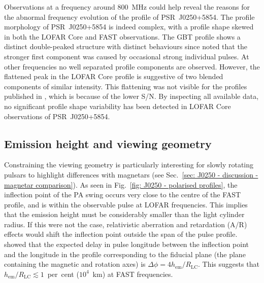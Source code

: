 Observations at a frequency around 800~MHz could help reveal the reasons for the abnormal frequency evolution of the profile of PSR~J0250+5854. The profile morphology of PSR~J0250+5854 is indeed complex, with a profile shape skewed in both the LOFAR Core and FAST observations. The GBT profile shows a distinct double-peaked structure with distinct behaviours since \citet{TBC+2018} noted that the stronger first component was caused by occasional strong individual pulses. At other frequencies no well separated profile components are observed. However, the flattened peak in the LOFAR Core profile is suggestive of two blended components of similar intensity. This flattening was not visible for the profiles published in \citet{TBC+2018}, which is because of the lower S/N. By inspecting all available data, no significant profile shape variability has been detected in LOFAR Core observations of PSR~J0250+5854.
















\subsection{Emission height and viewing geometry}
\label{sec: J0250 - discussion - geometry}
Constraining the viewing geometry is particularly interesting for slowly rotating pulsars to highlight differences with magnetars (see Sec.~\ref{sec: J0250 - discussion - magnetar comparison}). As seen in Fig.~\ref{fig: J0250 - polarised profiles}, the inflection point of the PA swing occurs very close to the centre of the FAST profile, and is within the observable pulse at LOFAR frequencies. This implies that the emission height must be considerably smaller than the light cylinder radius. If this were not the case, relativistic aberration and retardation (A/R) effects would shift the inflection point outside the span of the pulse profile. \citet{BCWx1991} showed that the expected delay in pulse longitude between the inflection point and the longitude in the profile corresponding to the fiducial plane (the plane containing the magnetic and rotation axes) is $\Delta\phi = 4 h_\mathrm{em} / R_\mathrm{LC}$. This suggests that $h_\mathrm{em} / R_\mathrm{LC} \lesssim 1$~per~cent ($10^{4}$~km) at FAST frequencies.

